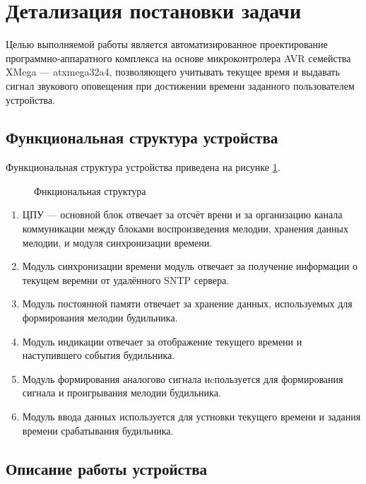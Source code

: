 \section{Детализация постановки задачи}
\begin{par}
Целью выполняемой работы является автоматизированное проектирование программно-аппаратного комплекса
на основе микроконтролера AVR семейства XMega --- atxmega32a4, позволяющего учитывать текущее время
и выдавать сигнал звукового оповещения при достижении времени заданного пользователем устройства.
\end{par}

\subsection{Функциональная структура устройства}

Функциональная структура устройства приведена на рисунке \ref{img:funcd}.

\begin{figure}[h]
	\caption{Фнкциональная структура}
	\label{img:funcd}
\end{figure}

\begin{enumerate}
    \item{}ЦПУ --- основной блок отвечает за отсчёт врени и за организацию канала коммуникации
        между блоками воспроизведения мелодии, хранения данных мелодии, и модуля синхронизации времени.
    \item{}Модуль синхронизации времени модуль отвечает за получение информации о текущем веремни
            от удалённого SNTP сервера.
    \item{}Модуль постоянной памяти отвечает за хранение данных, используемых для формирования
        мелодии будильника.
    \item{}Модуль индикации отвечает за отображение текущего времени и наступившего события
        будильника.
    \item{}Модуль формирования аналогово сигнала иcпользуется для формирования сигнала и проигрывания
            мелодии будильника.
    \item{}Модуль ввода данных используется для устновки текущего времени и задания
        времени срабатывания будильника.
\end{enumerate}


\subsection{Описание работы устройства}
